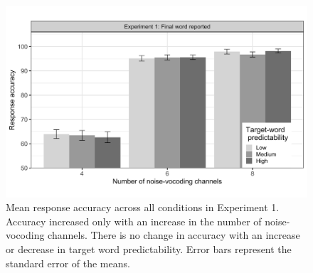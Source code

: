 \documentclass[a4paper, nobind]{templates/ociamthesis}
\begin{document}
\begin{figure}

{\centering \includegraphics[width=0.95\linewidth]{figures/results-fig/expt-1a} 

}

\caption{Mean response accuracy across all conditions in Experiment 1. Accuracy increased only with an increase in the number of noise-vocoding channels. There is no change in accuracy with an increase or decrease in target word predictability. Error bars represent the standard error of the means.}\label{fig:figure1a}
\end{figure}
\end{document}
